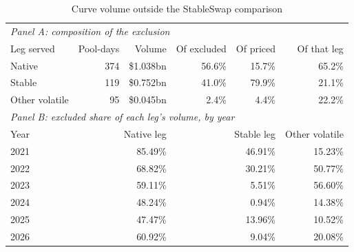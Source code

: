 \begin{table}[t]
\centering
\caption{Curve volume outside the StableSwap comparison}
\label{tab:app:curveleg}
\small
\begin{tabular}{lrrrrr}
\toprule
\multicolumn{6}{l}{\emph{Panel A: composition of the exclusion}} \\
Leg served & Pool-days & Volume & Of excluded & Of priced & Of that leg \\
\midrule
Native & 374 & \$1.038bn & 56.6\% & 15.7\% & 65.2\% \\
Stable & 119 & \$0.752bn & 41.0\% & 79.9\% & 21.1\% \\
Other volatile & 95 & \$0.045bn & 2.4\% & 4.4\% & 22.2\% \\
\midrule
\multicolumn{6}{l}{\emph{Panel B: excluded share of each leg's volume, by year}} \\
Year & \multicolumn{2}{r}{Native leg} & \multicolumn{2}{r}{Stable leg} & Other volatile \\
\midrule
2021 & \multicolumn{2}{r}{85.49\%} & \multicolumn{2}{r}{46.91\%} & 15.23\% \\
2022 & \multicolumn{2}{r}{68.82\%} & \multicolumn{2}{r}{30.21\%} & 50.77\% \\
2023 & \multicolumn{2}{r}{59.11\%} & \multicolumn{2}{r}{5.51\%} & 56.60\% \\
2024 & \multicolumn{2}{r}{48.24\%} & \multicolumn{2}{r}{0.94\%} & 14.38\% \\
2025 & \multicolumn{2}{r}{47.47\%} & \multicolumn{2}{r}{13.96\%} & 10.52\% \\
2026 & \multicolumn{2}{r}{60.92\%} & \multicolumn{2}{r}{9.04\%} & 20.08\% \\
\bottomrule
\end{tabular}
\end{table}


